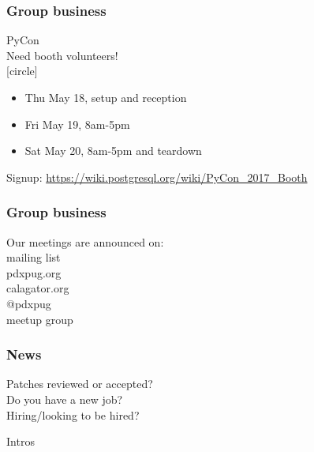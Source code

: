 \documentclass{beamer}
\begin{document}
\frame
{
  \frametitle{Group business}
  \begin{center}
{\large PyCon\\}
Need booth volunteers!\\
[circle]
\begin{itemize}
\item Thu May 18, setup and reception\\
\item Fri May 19, 8am-5pm\\
\item Sat May 20, 8am-5pm and teardown\\
\end{itemize}
\vspace{5mm}
Signup: \url{https://wiki.postgresql.org/wiki/PyCon_2017_Booth}
\vspace{5mm}
  \end{center}
}


\frame
{
  \frametitle{Group business}
  \begin{center}
{\large Our meetings are announced on:\\}
mailing list\\
pdxpug.org\\
calagator.org\\
@pdxpug\\
meetup group\\
\vspace{5mm}
  \end{center}
}

\frame
{
  \frametitle{News}
  \begin{center}
Patches reviewed or accepted?\\
Do you have a new job?\\
Hiring/looking to be hired?\\
  \end{center}
}

\frame
{
  \begin{center}
{\huge Intros\\}
  \end{center}
}
\end{document}
